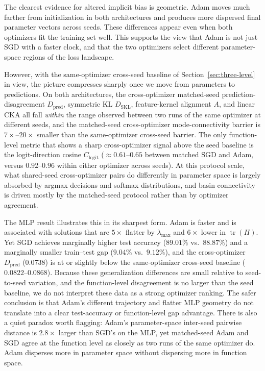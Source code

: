 \documentclass[11pt]{article}
\begin{document}
The clearest evidence for altered implicit bias is geometric. Adam moves much farther from initialization in both architectures and produces more dispersed final parameter vectors across seeds. These differences appear even when both optimizers fit the training set well. This supports the view that Adam is not just SGD with a faster clock, and that the two optimizers select different parameter-space regions of the loss landscape.

However, with the same-optimizer cross-seed baseline of Section~\ref{sec:three-level} in view, the picture compresses sharply once we move from parameters to predictions. On both architectures, the cross-optimizer matched-seed prediction-disagreement $D_{\mathrm{pred}}$, symmetric KL $D_{\mathrm{SKL}}$, feature-kernel alignment $A$, and linear CKA all fall \emph{within} the range observed between two runs of the same optimizer at different seeds, and the matched-seed cross-optimizer mode-connectivity barrier is $7\times$--$20\times$ smaller than the same-optimizer cross-seed barrier. The only function-level metric that shows a sharp cross-optimizer signal above the seed baseline is the logit-direction cosine $C_{\mathrm{logit}}$ ($\approx 0.61$--$0.65$ between matched SGD and Adam, versus $0.92$--$0.96$ within either optimizer across seeds). At this protocol scale, what shared-seed cross-optimizer pairs do differently in parameter space is largely absorbed by argmax decisions and softmax distributions, and basin connectivity is driven mostly by the matched-seed protocol rather than by optimizer agreement.

The MLP result illustrates this in its sharpest form. Adam is faster and is associated with solutions that are $5\times$ flatter by $\lambda_{\max}$ and $6\times$ lower in $\operatorname{tr}(H)$. Yet SGD achieves marginally higher test accuracy ($89.01\%$ vs.\ $88.87\%$) and a marginally smaller train--test gap ($9.04\%$ vs.\ $9.12\%$), and the cross-optimizer $D_{\mathrm{pred}}$ ($0.0738$) is at or slightly below the same-optimizer cross-seed baseline ($0.0822$--$0.0868$). Because these generalization differences are small relative to seed-to-seed variation, and the function-level disagreement is no larger than the seed baseline, we do not interpret these data as a strong optimizer ranking. The safer conclusion is that Adam's different trajectory and flatter MLP geometry do not translate into a clear test-accuracy or function-level gap advantage. There is also a quiet paradox worth flagging: Adam's parameter-space inter-seed pairwise distance is $2.8\times$ larger than SGD's on the MLP, yet matched-seed Adam and SGD agree at the function level as closely as two runs of the same optimizer do. Adam disperses more in parameter space without dispersing more in function space.
\end{document}
